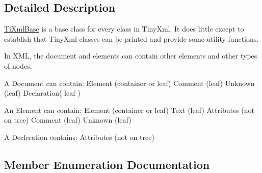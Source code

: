 \subsection{Detailed Description}
\hyperlink{class_ti_xml_base}{Ti\+Xml\+Base} is a base class for every class in Tiny\+Xml. It does little except to establish that Tiny\+Xml classes can be printed and provide some utility functions.

In X\+ML, the document and elements can contain other elements and other types of nodes.

\begin{DoxyVerb}A Document can contain: Element (container or leaf)
                        Comment (leaf)
                        Unknown (leaf)
                        Declaration( leaf )

An Element can contain: Element (container or leaf)
                        Text    (leaf)
                        Attributes (not on tree)
                        Comment (leaf)
                        Unknown (leaf)

A Decleration contains: Attributes (not on tree)
\end{DoxyVerb}
 

\subsection{Member Enumeration Documentation}

